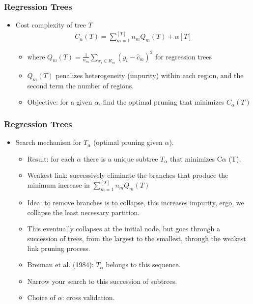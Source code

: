 \documentclass[
  shownotes,
  xcolor={svgnames},
  hyperref={colorlinks,citecolor=DarkBlue,linkcolor=DarkRed,urlcolor=DarkBlue}
  , aspectratio=169]{beamer}
\begin{document}
\begin{frame}[fragile]
\frametitle{Regression Trees}

\begin{itemize}
\item Cost complexity of tree $T$
\begin{align}
  C_{\alpha}(T)= \sum_{m=1}^{[T]} n_m Q_m (T) + \alpha [T]
\end{align}

  \begin{itemize}
  \item where $Q_m (T)=\frac{1}{n_m} \sum_{x_i\in R_m} (y_i-\hat{c}_m)^2$ for regression trees
  \medskip
  \item  $Q_m (T)$ penalizes heterogeneity (impurity) within each region, and the second term the number of regions.
  \medskip
  \item  Objective: for a given $\alpha$, find the optimal pruning that minimizes $C_{\alpha}(T)$
  \end{itemize}
\end{itemize}
\end{frame}

\begin{frame}[fragile]
\frametitle{Regression Trees}

\begin{itemize}
\item Search mechanism for $T_\alpha$ (optimal pruning given $\alpha$).
\begin{itemize}
\item Result: for each $\alpha$ there is a unique subtree $T_\alpha$ that minimizes C$\alpha$ (T).
\medskip
\item Weakest link: successively eliminate the branches that produce the minimum increase in   $\sum_{m=1}^{[T]} n_m  Q_m (T)$
\medskip
\item Idea: to remove branches is to collapse, this increases impurity, ergo, we collapse the least necessary partition.
\medskip
\item This eventually collapses at the initial node, but goes through a succession of trees, from the largest to the smallest, through the weakest link pruning process.
\medskip
\item Breiman et al. (1984): $T_\alpha$ belongs to this sequence. 
\medskip
\item Narrow your search to this succession of subtrees. 
\medskip
\item Choice of $\alpha$: cross validation.
\end{itemize}

\end{itemize}




\end{frame}
\end{document}
